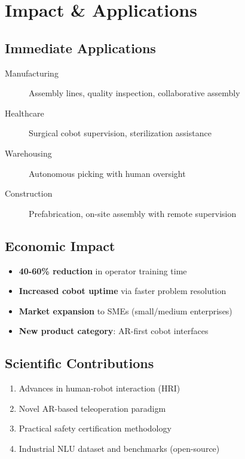 \documentclass[12pt,a4paper,oneside]{book}
\begin{document}
\newpage

\chapter{Impact \& Applications}

\section{Immediate Applications}

\begin{description}
    \item[Manufacturing] Assembly lines, quality inspection, collaborative assembly
    \item[Healthcare] Surgical cobot supervision, sterilization assistance
    \item[Warehousing] Autonomous picking with human oversight
    \item[Construction] Prefabrication, on-site assembly with remote supervision
\end{description}

\section{Economic Impact}

\begin{itemize}
    \item \textbf{40-60\% reduction} in operator training time
    \item \textbf{Increased cobot uptime} via faster problem resolution
    \item \textbf{Market expansion} to SMEs (small/medium enterprises)
    \item \textbf{New product category}: AR-first cobot interfaces
\end{itemize}

\section{Scientific Contributions}

\begin{enumerate}
    \item Advances in human-robot interaction (HRI)
    \item Novel AR-based teleoperation paradigm
    \item Practical safety certification methodology
    \item Industrial NLU dataset and benchmarks (open-source)
\end{enumerate}
\end{document}
